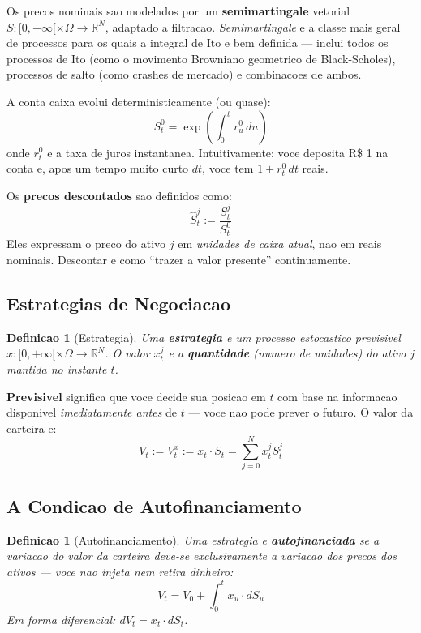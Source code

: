 \documentclass[12pt,a4paper]{article}
\newtheorem{defi}[teo]{Definicao}
\theoremstyle{remark}
\begin{document}
Os precos nominais sao modelados por um \textbf{semimartingale} vetorial
$S: [0,+\infty[\times\Omega \to \mathbb{R}^N$, adaptado a filtracao.
\textit{Semimartingale} e a classe mais geral de processos para os quais a
integral de Ito e bem definida — inclui todos os processos de Ito (como o
movimento Browniano geometrico de Black-Scholes), processos de salto (como
crashes de mercado) e combinacoes de ambos.

A conta caixa evolui deterministicamente (ou quase):
\[
S_t^0 = \exp\left(\int_0^t r_u^0\, du\right)
\]
onde $r_t^0$ e a taxa de juros instantanea. Intuitivamente: voce deposita R\$ 1
na conta e, apos um tempo muito curto $dt$, voce tem $1 + r_t^0\,dt$ reais.

Os \textbf{precos descontados} sao definidos como:
\[
\hat{S}_t^j := \frac{S_t^j}{S_t^0}
\]
Eles expressam o preco do ativo $j$ em \textit{unidades de caixa atual}, nao em
reais nominais. Descontar e como ``trazer a valor presente'' continuamente.

\subsection{Estrategias de Negociacao}

\begin{defi}[Estrategia]
Uma \textbf{estrategia} e um processo estocastico previsivel
$x: [0,+\infty[\times\Omega \to \mathbb{R}^N$. O valor $x_t^j$ e a
\textbf{quantidade} (numero de unidades) do ativo $j$ mantida no instante $t$.
\end{defi}

\textbf{Previsivel} significa que voce decide sua posicao em $t$ com base na
informacao disponivel \textit{imediatamente antes} de $t$ — voce nao pode prever
o futuro. O valor da carteira e:
\[
V_t := V_t^x := x_t \cdot S_t = \sum_{j=0}^N x_t^j S_t^j
\]

\subsection{A Condicao de Autofinanciamento}

\begin{defi}[Autofinanciamento]
Uma estrategia e \textbf{autofinanciada} se a variacao do valor da carteira deve-se
exclusivamente a variacao dos precos dos ativos — voce nao injeta nem retira
dinheiro:
\[
V_t = V_0 + \int_0^t x_u \cdot dS_u
\]
Em forma diferencial: $dV_t = x_t \cdot dS_t$.
\end{defi}
\end{document}
